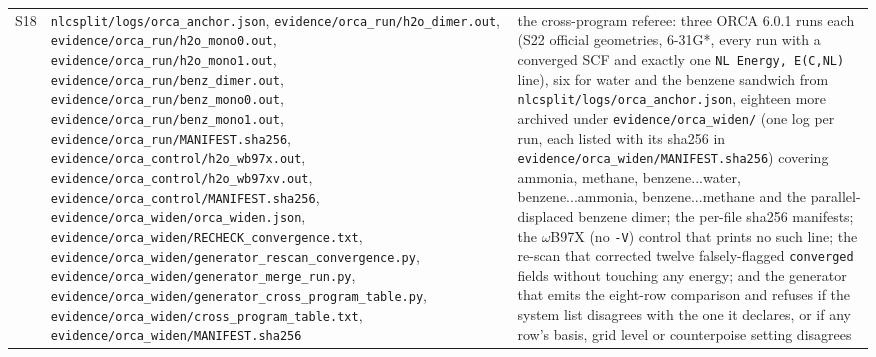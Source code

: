\documentclass[11pt]{article}
\begin{document}
\begin{longtable}{c>{\raggedright\arraybackslash}p{}>{\raggedright\arraybackslash}p{}}
S18 & \texttt{nlcsplit/\allowbreak{}logs/\allowbreak{}orca\_\allowbreak{}anchor.json}, \texttt{evidence/\allowbreak{}orca\_\allowbreak{}run/\allowbreak{}h2o\_\allowbreak{}dimer.out}, \texttt{evidence/\allowbreak{}orca\_\allowbreak{}run/\allowbreak{}h2o\_\allowbreak{}mono0.out}, \texttt{evidence/\allowbreak{}orca\_\allowbreak{}run/\allowbreak{}h2o\_\allowbreak{}mono1.out}, \texttt{evidence/\allowbreak{}orca\_\allowbreak{}run/\allowbreak{}benz\_\allowbreak{}dimer.out}, \texttt{evidence/\allowbreak{}orca\_\allowbreak{}run/\allowbreak{}benz\_\allowbreak{}mono0.out}, \texttt{evidence/\allowbreak{}orca\_\allowbreak{}run/\allowbreak{}benz\_\allowbreak{}mono1.out}, \texttt{evidence/\allowbreak{}orca\_\allowbreak{}run/\allowbreak{}MANIFEST.sha256}, \texttt{evidence/\allowbreak{}orca\_\allowbreak{}control/\allowbreak{}h2o\_\allowbreak{}wb97x.out}, \texttt{evidence/\allowbreak{}orca\_\allowbreak{}control/\allowbreak{}h2o\_\allowbreak{}wb97xv.out}, \texttt{evidence/\allowbreak{}orca\_\allowbreak{}control/\allowbreak{}MANIFEST.sha256}, \texttt{evidence/\allowbreak{}orca\_\allowbreak{}widen/\allowbreak{}orca\_\allowbreak{}widen.json}, \texttt{evidence/\allowbreak{}orca\_\allowbreak{}widen/\allowbreak{}RECHECK\_\allowbreak{}convergence.txt}, \texttt{evidence/\allowbreak{}orca\_\allowbreak{}widen/\allowbreak{}generator\_\allowbreak{}rescan\_\allowbreak{}convergence.py}, \texttt{evidence/\allowbreak{}orca\_\allowbreak{}widen/\allowbreak{}generator\_\allowbreak{}merge\_\allowbreak{}run.py}, \texttt{evidence/\allowbreak{}orca\_\allowbreak{}widen/\allowbreak{}generator\_\allowbreak{}cross\_\allowbreak{}program\_\allowbreak{}table.py}, \texttt{evidence/\allowbreak{}orca\_\allowbreak{}widen/\allowbreak{}cross\_\allowbreak{}program\_\allowbreak{}table.txt}, \texttt{evidence/\allowbreak{}orca\_\allowbreak{}widen/\allowbreak{}MANIFEST.sha256} & the cross-program referee: three ORCA 6.0.1 runs each (S22 official geometries, 6-31G*, every run with a converged SCF and exactly one \texttt{NL Energy, E(C,NL)} line), six for water and the benzene sandwich from \texttt{nlcsplit/\allowbreak{}logs/\allowbreak{}orca\_\allowbreak{}anchor.json}, eighteen more archived under \texttt{evidence/orca\_widen/} (one log per run, each listed with its sha256 in \texttt{evidence/\allowbreak{}orca\_\allowbreak{}widen/\allowbreak{}MANIFEST.sha256}) covering ammonia, methane, benzene...water, benzene...ammonia, benzene...methane and the parallel-displaced benzene dimer; the per-file sha256 manifests; the $\omega$B97X (no \texttt{-V}) control that prints no such line; the re-scan that corrected twelve falsely-flagged \texttt{converged} fields without touching any energy; and the generator that emits the eight-row comparison and refuses if the system list disagrees with the one it declares, or if any row's basis, grid level or counterpoise setting disagrees \\

\end{longtable}
\end{document}

